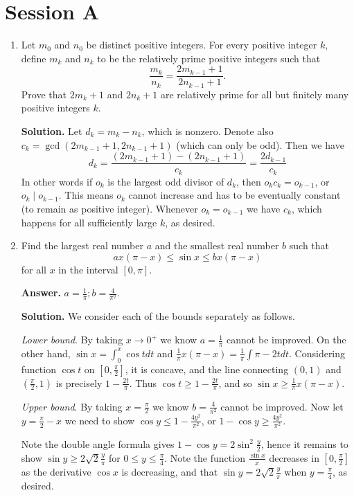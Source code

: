 \documentclass[11pt,a4paper]{article}
\begin{document}
	\section*{Session A}
	\begin{enumerate}
		\item [A1.]
		Let $m_0$ and $n_0$ be distinct positive integers. For every positive integer $k$, define $m_k$ and $n_k$ to be the relatively prime positive integers such that
		\[\frac{m_k}{n_k}=\frac{2m_{k-1}+1}{2n_{k-1}+1}.\]Prove that $2m_k+1$ and $2n_k+1$ are relatively prime for all but finitely many positive integers $k$.
		
		\textbf{Solution.} 
		Let $d_k = m_k - n_k$, which is nonzero. Denote also $c_k = \gcd(2m_{k-1} + 1, 2n_{k-1}+1)$ (which can only be odd). Then we have 
		\[
		d_k = \frac{(2m_{k-1} + 1) - (2n_{k-1} + 1)}{c_k} = \frac{2d_{k - 1}}{c_k}
		\]
		In other words if $o_k$ is the largest odd divisor of $d_k$, then $o_kc_k=o_{k-1}$, or $o_k\mid o_{k-1}$. 
		This means $o_k$ cannot increase and has to be eventually constant (to remain as positive integer). 
		Whenever $o_k=o_{k-1}$ we have $c_k$, which happens for all sufficiently large $k$, as desired. 
		
		\item [A2.] 
		Find the largest real number $a$ and the smallest real number $b$ such that
		\[ax(\pi-x) \le \sin x \le bx(\pi-x)\]for all $x$ in the interval $[0,\pi]$.
		
		\textbf{Answer.} $a=\frac{1}{\pi}; b=\frac{4}{\pi^2}$. 
		
		\textbf{Solution.} We consider each of the bounds separately as follows. 
		
		\textit{Lower bound}. By taking $x\to 0^+$ we know $a=\frac{1}{\pi}$ cannot be improved. On the other hand, $\sin x = \int_0^x \cos t dt$ and $\frac{1}{\pi}x(\pi-x)=\frac{1}{\pi}\int \pi - 2tdt$.
		Considering function $\cos t$ on $[0, \frac{\pi}{2}]$, it is concave, and the line connecting $(0, 1)$ and $(\frac{\pi}{2}, 1)$ is precisely $1 - \frac{2t}{\pi}$.
		Thus $\cos t \ge 1 - \frac{2t}{\pi}$, and so $\sin x \ge \frac{1}{\pi}x(\pi-x)$.
		
		\textit{Upper bound}. By taking $x=\frac{\pi}{2}$ we know $b=\frac{4}{\pi^2}$ cannot be improved. Now let $y = \frac{\pi}{2} - x$ we need to show $\cos y\le 1 - \frac{4y^2}{\pi^2}$, or $1-\cos y\ge \frac{4y^2}{\pi^2}$.
		
		Note the double angle formula gives $1-\cos y=2\sin^2 \frac{y}{2}$, hence it remains to show
		$\sin y \ge 2\sqrt{2}\frac{y}{\pi}$ for $0\le y\le \frac{\pi}{4}$. Note the function $\frac{\sin x}{x}$ decreases in $[0, \frac{\pi}{2}]$ as the derivative $\cos x$ is decreasing, and that $\sin y = 2\sqrt{2}\frac{y}{\pi}$ when $y=\frac{\pi}{4}$, as desired.
		

\end{enumerate}
\end{document}
